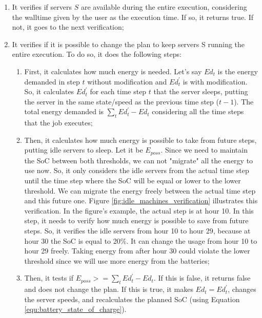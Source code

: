 \begin{enumerate}
    \item It verifies if servers $S$ are available during the entire execution, considering the walltime given by the user as the execution time. If so, it returns true. If not, it goes to the next verification;
    \item It verifies if it is possible to change the plan to keep servers S running the entire execution. To do so, it does the following steps:
    \begin{enumerate}
        \item First, it calculates how much energy is needed. Let's say $Ed_t$ is the energy demanded in step $t$ without modification and $Ed_t^{'}$ is with modification. So, it calculates $Ed_t^{'}$ for each time step $t$ that the server sleeps, putting the server in the same state/speed as the previous time step ($t-1$). The total energy demanded is $\sum_{t} Ed_t^{'} - Ed_t$ considering all the time steps that the job executes;
        \item Then, it calculates how much energy is possible to take from future steps, putting idle servers to sleep. Let it be $E_{poss}$. Since we need to maintain the SoC between both thresholds, we can not "migrate" all the energy to use now. So, it only considers the idle servers from the actual time step until the time step where the SoC will be equal or lower to the lower threshold. We can migrate the energy freely between the actual time step and this future one. Figure \ref{fig:idle_machines_verification} illustrates this verification. In the figure's example, the actual step is at hour 10. In this step, it needs to verify how much energy is possible to save from future steps. So, it verifies the idle servers from hour 10 to hour 29, because at hour 30 the SoC is equal to 20\%. It can change the usage from hour 10 to hour 29 freely. Taking energy from after hour 30 could violate the lower threshold since we will use more energy from the batteries;
        \item Then, it tests if $E_{poss} >= \sum_{t} Ed_t^{'} - Ed_t$. If this is false, it returns false and does not change the plan. If this is true, it makes $Ed_t = Ed_t^{'}$, changes the server speeds, and recalculates the planned SoC (using Equation \ref{equ:battery_state_of_charge}).
    \end{enumerate}
\end{enumerate}

